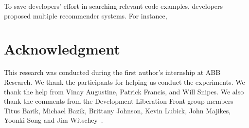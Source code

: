 To save developers' effort in searching relevant code examples, developers
proposed multiple recommender systems. For instance,  





\section*{Acknowledgment}
This research was conducted during the first author's internship at ABB
Research. We thank the participants for helping us conduct the experiments. We
thank the help from Vinay Augustine, Patrick Francis, and Will Snipes. We also
thank the comments from the Development Liberation Front group members Titus
Barik, Michael Bazik, Brittany Johnson, Kevin Lubick, John Majikes, Yoonki Song
and Jim Witschey~\cite{Bacchelli}.






